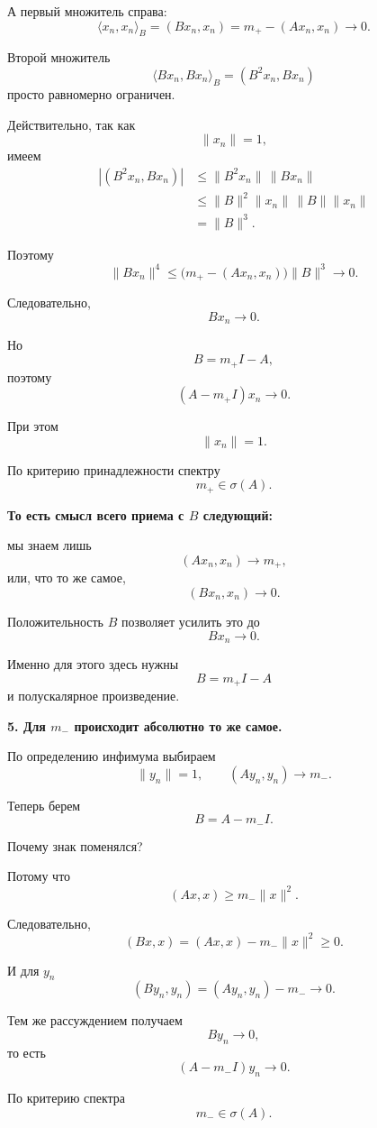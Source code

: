 \begin{idea}
	А первый множитель справа:
	\[
	\langle x_n,x_n\rangle_B
	=
	(Bx_n,x_n)
	=
	m_+-(Ax_n,x_n)
	\to0.
	\]
	
	Второй множитель
	\[
	\langle Bx_n,Bx_n\rangle_B
	=
	(B^2x_n,Bx_n)
	\]
	просто равномерно ограничен.
	
	Действительно, так как
	\[
	\|x_n\|=1,
	\]
	имеем
	\[
	\begin{aligned}
		|(B^2x_n,Bx_n)|
		&\leq
		\|B^2x_n\|\,\|Bx_n\|
		\\
		&\leq
		\|B\|^2\|x_n\|\,
		\|B\|\|x_n\|
		\\
		&=
		\|B\|^3.
	\end{aligned}
	\]
	
	Поэтому
	\[
	\|Bx_n\|^4
	\leq
	\bigl(m_+-(Ax_n,x_n)\bigr)\|B\|^3
	\to0.
	\]
	
	Следовательно,
	\[
	\boxed{Bx_n\to0.}
	\]
	
	Но
	\[
	B=m_+I-A,
	\]
	поэтому
	\[
	(A-m_+I)x_n\to0.
	\]
	
	При этом
	\[
	\|x_n\|=1.
	\]
	
	По критерию принадлежности спектру
	\[
	\boxed{m_+\in\sigma(A).}
	\]
	
	\medskip
	
	\textbf{То есть смысл всего приема с \(B\) следующий:}
	
	мы знаем лишь
	\[
	(Ax_n,x_n)\to m_+,
	\]
	или, что то же самое,
	\[
	(Bx_n,x_n)\to0.
	\]
	
	Положительность \(B\) позволяет усилить это до
	\[
	Bx_n\to0.
	\]
	
	Именно для этого здесь нужны
	\[
	B=m_+I-A
	\]
	и полускалярное произведение.
	
	\medskip
	
	\textbf{5. Для \(m_-\) происходит абсолютно то же самое.}
	
	По определению инфимума выбираем
	\[
	\|y_n\|=1,
	\qquad
	(Ay_n,y_n)\to m_-.
	\]
	
	Теперь берем
	\[
	B=A-m_-I.
	\]
	
	Почему знак поменялся?
	
	Потому что
	\[
	(Ax,x)\geq m_-\|x\|^2.
	\]
	
	Следовательно,
	\[
	(Bx,x)
	=
	(Ax,x)-m_-\|x\|^2
	\geq0.
	\]
	
	И для \(y_n\)
	\[
	(By_n,y_n)
	=
	(Ay_n,y_n)-m_-
	\to0.
	\]
	
	Тем же рассуждением получаем
	\[
	By_n\to0,
	\]
	то есть
	\[
	(A-m_-I)y_n\to0.
	\]
	
	По критерию спектра
	\[
	\boxed{m_-\in\sigma(A).}
	\]
	

\end{idea}
